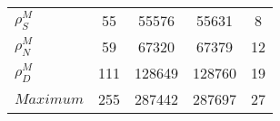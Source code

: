 \begin{center}
\begin{longtable}{lcccc}
$ {\rho^{M}_{S}}       $	 & 	                   55	 & 	                55576	 & 	                55631	 & 	                    8 \\ 
$ {\rho^{M}_{N}}       $	 & 	                   59	 & 	                67320	 & 	                67379	 & 	                   12 \\ 
$ {\rho^{M}_{D}}       $	 & 	                  111	 & 	               128649	 & 	               128760	 & 	                   19 \\ 
$Maximum               $	 & 	                  255	 & 	               287442	 & 	               287697	 & 	                   27 \\ 
\end{longtable}
 \end{center}
